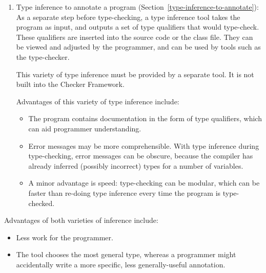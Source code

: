 {\begin{enumerate}
  This variety of type inference is built into the Checker Framework.  Every
  checker can take advantage of it at no extra effort.  However, it only
  works within a method, not across method boundaries.

  Advantages of this variety of type inference include:
  \begin{itemize}
  \item
    If the type qualifier is obvious to the programmer, then omitting it
    can reduce annotation clutter in the program.
  \item
    The type inference can take advantage of only the code currently being
    compiled, rather than having to be correct for all possible calls.
    Additionally, if the code changes, then there is no old annotation to
    update.
  \end{itemize}


\item
  Type inference to annotate a program (Section~\ref{type-inference-to-annotate}):
  As a separate step before type-checking, a type inference tool takes the
  program as input, and outputs a set of type qualifiers that would
  type-check.  These qualifiers are inserted into the source code or the
  class file.  They can be viewed and adjusted by the programmer, and can
  be used by tools such as the type-checker.

  This variety of type inference must be provided by a separate tool.  It
  is not built into the Checker Framework.

  Advantages of this variety of type inference include:
  \begin{itemize}
  \item
    The program contains documentation in the form of type qualifiers,
    which can aid programmer understanding.
  \item
    Error messages may be more comprehensible.  With type inference
    during type-checking, error messages can be obscure, because the
    compiler has already inferred (possibly incorrect) types for a number
    of variables.
  \item
    A minor advantage is speed:  type-checking can be modular, which can be
    faster than re-doing type inference every time the
    program is type-checked.
  \end{itemize}

\end{enumerate}

Advantages of both varieties of inference include:
\begin{itemize}
\item
  Less work for the programmer.
\item
  The tool chooses the most general type, whereas a programmer might
  accidentally write a more specific, less generally-useful annotation.
\end{itemize}


}

